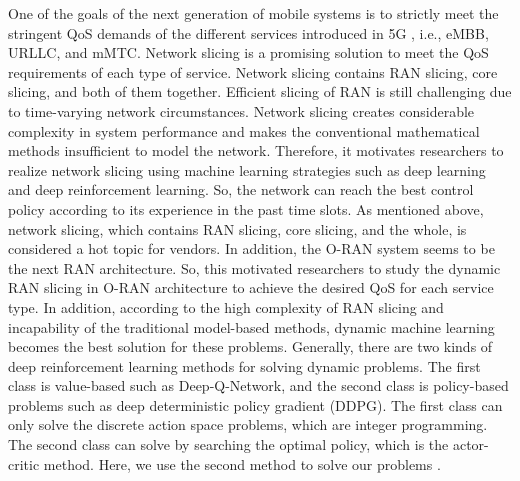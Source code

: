 \documentclass{article}
\begin{document}
One of the goals of the next generation of mobile systems is to strictly meet the stringent QoS demands of the different services introduced in 5G , i.e., eMBB, URLLC, and mMTC. Network slicing is a promising solution to meet the QoS requirements of each type of service. Network slicing contains RAN slicing, core slicing, and both of them together. Efficient slicing of RAN is still challenging due to time-varying network circumstances.
Network slicing creates considerable complexity in system performance and makes the conventional mathematical methods insufficient to model the network.
Therefore, it motivates researchers to realize network slicing using machine learning strategies such as deep learning and deep reinforcement learning. So, the network can reach the best control policy according to its experience in the past time slots.
As mentioned above, network slicing, which contains RAN slicing, core slicing, and the whole, is considered a hot topic for vendors. In addition, the O-RAN system seems to be the next RAN architecture. So, this motivated researchers to study the dynamic RAN slicing in O-RAN architecture to achieve the desired QoS for each service type.
In addition, according to the high complexity of RAN slicing and incapability of the traditional model-based methods, dynamic machine learning becomes the best solution for these problems.
 Generally, there are two kinds of deep reinforcement learning methods for solving dynamic problems. The first class is value-based such as Deep-Q-Network, and the second class is policy-based problems such as
deep deterministic policy gradient (DDPG). The first class can only solve the discrete action space problems, which are integer programming. The second class can solve by searching the optimal policy, which is the actor-critic method. Here, we use the second method to solve our problems \cite{alsenwi2021intelligent,yan2019intelligent,mei2021intelligent}.
\end{document}
